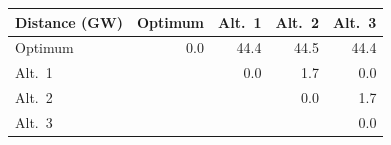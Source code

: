 \begin{tabular}{lrrrr}
\toprule
\textbf{Distance (GW)} & \textbf{Optimum} & \textbf{Alt.~1} & \textbf{Alt.~2} & \textbf{Alt.~3}\\
\midrule
Optimum & 0.0 & 44.4 & 44.5 & 44.4\\
Alt.~1 &  & 0.0 & 1.7 & 0.0\\
Alt.~2 &  &  & 0.0 & 1.7\\
Alt.~3 &  &  &  & 0.0\\
\bottomrule
\end{tabular}
